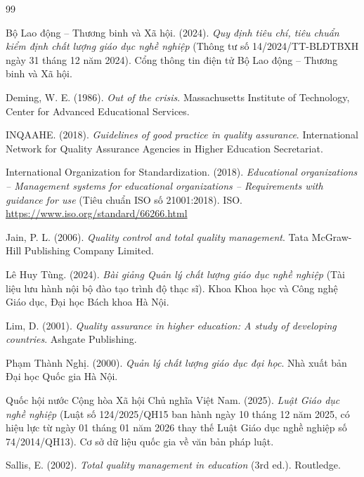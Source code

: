 \renewcommand{\refname}{Tài liệu tham khảo}

\begin{thebibliography}{99}

Bộ Lao động -- Thương binh và Xã hội. (2024). \textit{Quy định tiêu chí, tiêu chuẩn kiểm định chất lượng giáo dục nghề nghiệp} (Thông tư số 14/2024/TT-BLĐTBXH ngày 31 tháng 12 năm 2024). Cổng thông tin điện tử Bộ Lao động -- Thương binh và Xã hội.

Deming, W. E. (1986). \textit{Out of the crisis}. Massachusetts Institute of Technology, Center for Advanced Educational Services.

INQAAHE. (2018). \textit{Guidelines of good practice in quality assurance}. International Network for Quality Assurance Agencies in Higher Education Secretariat.

International Organization for Standardization. (2018). \textit{Educational organizations -- Management systems for educational organizations -- Requirements with guidance for use} (Tiêu chuẩn ISO số 21001:2018). ISO. \url{https://www.iso.org/standard/66266.html}

Jain, P. L. (2006). \textit{Quality control and total quality management}. Tata McGraw-Hill Publishing Company Limited.

Lê Huy Tùng. (2024). \textit{Bài giảng Quản lý chất lượng giáo dục nghề nghiệp} (Tài liệu lưu hành nội bộ đào tạo trình độ thạc sĩ). Khoa Khoa học và Công nghệ Giáo dục, Đại học Bách khoa Hà Nội.

Lim, D. (2001). \textit{Quality assurance in higher education: A study of developing countries}. Ashgate Publishing.

Phạm Thành Nghị. (2000). \textit{Quản lý chất lượng giáo dục đại học}. Nhà xuất bản Đại học Quốc gia Hà Nội.

Quốc hội nước Cộng hòa Xã hội Chủ nghĩa Việt Nam. (2025). \textit{Luật Giáo dục nghề nghiệp} (Luật số 124/2025/QH15 ban hành ngày 10 tháng 12 năm 2025, có hiệu lực từ ngày 01 tháng 01 năm 2026 thay thế Luật Giáo dục nghề nghiệp số 74/2014/QH13). Cơ sở dữ liệu quốc gia về văn bản pháp luật.

Sallis, E. (2002). \textit{Total quality management in education} (3rd ed.). Routledge.


\end{thebibliography}
